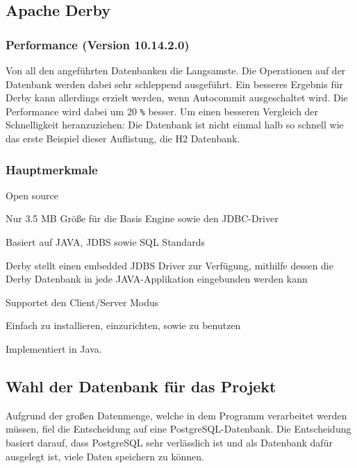 \subsection{Apache Derby}
\subsubsection{Performance (Version 10.14.2.0)}
Von all den angeführten Datenbanken die Langsamste. Die Operationen auf der Datenbank werden dabei sehr schleppend ausgeführt. Ein besseres Ergebnis für Derby kann allerdings erzielt werden, wenn Autocommit ausgeschaltet wird. Die Performance wird dabei um 20 \texttt{\%} besser. Um einen besseren Vergleich der Schnelligkeit heranzuziehen: Die Datenbank ist nicht einmal halb so schnell wie das erste Beispiel dieser Auflistung, die H2 Datenbank. \cite{databaseComparison}

\subsubsection{Hauptmerkmale}
 
\begin{compactitem}
    \item Open source
    \item Nur 3.5 MB Größe für die Basis Engine sowie den JDBC-Driver        
    \item Basiert auf JAVA, JDBS sowie SQL Standards
    \item Derby stellt einen embedded JDBS Driver zur Verfügung, mithilfe dessen die Derby Datenbank in jede JAVA-Applikation eingebunden werden kann
    \item Supportet den Client/Server Modus
    \item Einfach zu installieren, einzurichten, sowie zu benutzen
\end{compactitem}
\cite{ApacheDerbyOfficialSite}
 
Implementiert in Java.

\subsection{Wahl der Datenbank für das Projekt}
Aufgrund der großen Datenmenge, welche in dem Programm verarbeitet werden müssen, fiel die Entscheidung auf eine PostgreSQL-Datenbank. Die Entscheidung basiert darauf, dass PostgreSQL sehr verlässlich ist und als Datenbank dafür ausgelegt ist, viele Daten speichern zu können. 